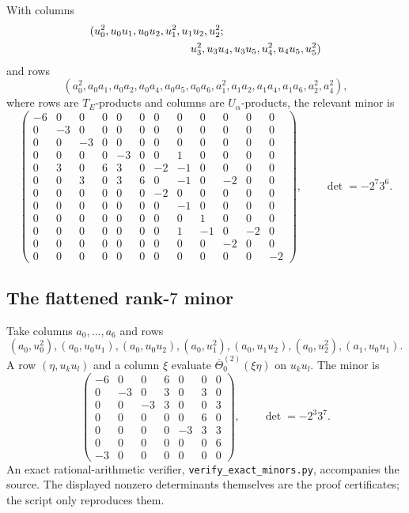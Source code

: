 \documentclass[11pt,reqno]{amsart}
\numberwithin{equation}{section}
\theoremstyle{definition}
\theoremstyle{remark}
\begin{document}
With columns
\[
\begin{split}
&(u_0^2,u_0u_1,u_0u_2,u_1^2,u_1u_2,u_2^2;\\
&\hspace{32mm}u_3^2,u_3u_4,u_3u_5,u_4^2,u_4u_5,u_5^2)
\end{split}
\]
and rows
\[
(a_0^2,a_0a_1,a_0a_2,a_0a_4,a_0a_5,a_0a_6,
a_1^2,a_1a_2,a_1a_4,a_1a_6,a_2^2,a_4^2),
\]
where rows are $T_E$-products and columns are $U_\alpha$-products, the relevant minor is
\begin{equation}\label{eq:matrix12}
\begin{pmatrix}
-6&0&0&0&0&0&0&0&0&0&0&0\\
0&-3&0&0&0&0&0&0&0&0&0&0\\
0&0&-3&0&0&0&0&0&0&0&0&0\\
0&0&0&0&-3&0&0&1&0&0&0&0\\
0&3&0&6&3&0&-2&-1&0&0&0&0\\
0&0&3&0&3&6&0&-1&0&-2&0&0\\
0&0&0&0&0&0&-2&0&0&0&0&0\\
0&0&0&0&0&0&0&-1&0&0&0&0\\
0&0&0&0&0&0&0&0&1&0&0&0\\
0&0&0&0&0&0&0&1&-1&0&-2&0\\
0&0&0&0&0&0&0&0&0&-2&0&0\\
0&0&0&0&0&0&0&0&0&0&0&-2
\end{pmatrix},
\qquad
\det=-2^7 3^6.
\end{equation}

\subsection{The flattened rank-\texorpdfstring{$7$}{7} minor}

Take columns $a_0,\ldots,a_6$ and rows
\[
(a_0,u_0^2),(a_0,u_0u_1),(a_0,u_0u_2),(a_0,u_1^2),
(a_0,u_1u_2),(a_0,u_2^2),(a_1,u_0u_1).
\]
A row $(\eta,u_ku_l)$ and a column $\xi$ evaluate
$\overline\Theta^{(2)}_0(\xi\eta)$ on $u_ku_l$.  The minor is
\begin{equation}\label{eq:matrix7}
\begin{pmatrix}
-6&0&0&6&0&0&0\\
0&-3&0&3&0&3&0\\
0&0&-3&3&0&0&3\\
0&0&0&0&0&6&0\\
0&0&0&0&-3&3&3\\
0&0&0&0&0&0&6\\
-3&0&0&0&0&0&0
\end{pmatrix},
\qquad
\det=-2^3 3^7.
\end{equation}
An exact rational-arithmetic verifier, \texttt{verify\_exact\_minors.py}, accompanies the source.  The displayed nonzero determinants themselves are the proof certificates; the script only reproduces them.
\end{document}

